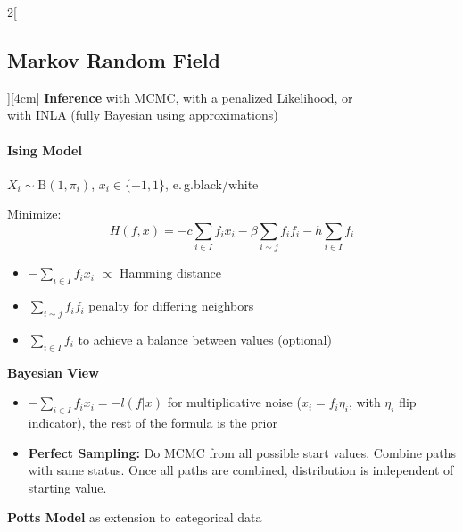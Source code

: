 \documentclass[8pt]{extarticle}
\begin{document}
\begin{multicols}{2}[\subsection{Markov Random Field}][4cm]
\textbf{Inference} with MCMC, with a penalized Likelihood, or \\
with INLA (fully Bayesian using approximations)

\paragraph{Ising Model}
 $X_i \sim \mathrm{B}(1, \pi_i)$, $x_i  \in \{-1,1\}$, e.\,g.\@ black/white
 
 Minimize:
 $$H(f,x) = -c\sum_{i\in I}f_ix_i -\beta\sum_{i\sim j}f_if_i -h\sum_{i\in I}f_i$$
\begin{itemize}[itemsep=-0.3em]
\item $-\sum_{i\in I}f_ix_i$ $\propto$ Hamming distance
\item $\sum_{i\sim j}f_if_i$ penalty for differing neighbors
\item $\sum_{i\in I}f_i$ to achieve a balance between values (optional)
\end{itemize}

\textbf{Bayesian View}\vspace{-0.8em} 
\begin{itemize}[itemsep=-0.4em]
\item ${-}\sum_{i\in I}f_ix_i =-l(f|x)$ for multiplicative noise ($x_i=f_i\eta_i$, with $\eta_i$ flip indicator), the rest of the formula is the prior
\item \textbf{Perfect Sampling:} Do MCMC from all possible start values. Combine paths with same status. Once all paths are combined, distribution is independent of starting value.
\end{itemize}

\textbf{Potts Model} as extension to categorical data

\end{multicols}
\end{document}
